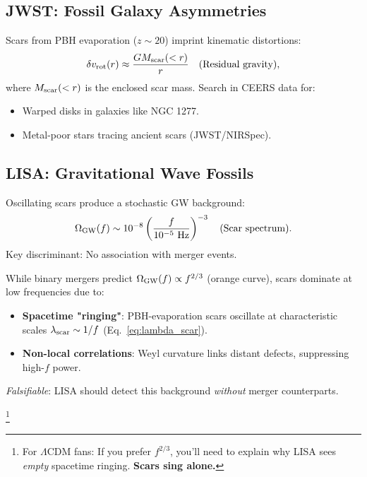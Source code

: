 \documentclass{article}
\begin{document}
\subsection{JWST: Fossil Galaxy Asymmetries}
Scars from PBH evaporation ($z \sim 20$) imprint kinematic distortions:
\FloatBarrier
\begin{equation}
    \delta v_{\rm rot}(r) \approx \frac{G M_{\rm scar}(<r)}{r} \quad \text{(Residual gravity)}, 
\end{equation}
where $M_{\rm scar}(<r)$ is the enclosed scar mass. Search in CEERS data for:
\begin{itemize}
    \item Warped disks in galaxies like NGC 1277.
    \item Metal-poor stars tracing ancient scars (JWST/NIRSpec).
\end{itemize}

\subsection{LISA: Gravitational Wave Fossils}
Oscillating scars produce a stochastic GW background:
\begin{equation}
    \Omega_{\rm GW}(f) \sim 10^{-8} \left(\frac{f}{10^{-5} \text{ Hz}}\right)^{-3} \quad \text{(Scar spectrum)}.
\end{equation}
Key discriminant: No association with merger events. \\ \par

\begin{tcolorbox}[colback=boxnormal,colframe=blue!50!black,title=\textbf{Why $f^{-3}$? Topology vs. Binaries}]
While binary mergers predict $\Omega_{\rm GW}(f) \propto f^{2/3}$ (orange curve), scars dominate at low frequencies due to:
\begin{itemize}
    \item \textbf{Spacetime "ringing"}: PBH-evaporation scars oscillate at characteristic scales $\lambda_{\rm scar} \sim 1/f$ (Eq.~\ref{eq:lambda_scar}).
    \item \textbf{Non-local correlations}: Weyl curvature links distant defects, suppressing high-$f$ power.
\end{itemize}
\textit{Falsifiable}: LISA should detect this background \textit{without} merger counterparts.
\end{tcolorbox}
\footnote{
    For $\Lambda$CDM fans: If you prefer $f^{2/3}$, you’ll need to explain why LISA sees \textit{empty} spacetime ringing. \textbf{Scars sing alone.}  
}
\end{document}
